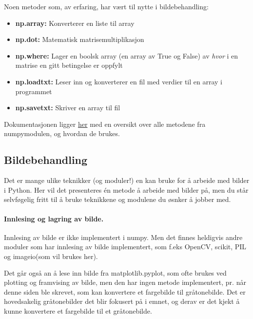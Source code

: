 \documentclass[%
oneside,                 %
final,                   %
10pt]{article}
\begin{document}
Noen metoder som, av erfaring, har vært til nytte i bildebehandling:
\begin{itemize}
\item \textbf{np.array:} Konverterer en liste til array

\item \textbf{np.dot:} Matematisk matrisemultiplikasjon

\item \textbf{np.where:} Lager en boolsk array (en array av True og False) av \emph{hvor} i en matrise en gitt betingelse er oppfylt

\item \textbf{np.loadtxt:} Leser inn og konverterer en fil med verdier til en array i programmet

\item \textbf{np.savetxt:} Skriver en array til fil
\end{itemize}

\noindent
Dokumentasjonen ligger \href{{https://docs.scipy.org/doc/numpy/reference/}}{her} med en oversikt over alle metodene fra numpymodulen, og hvordan de brukes.


\subsection{Bildebehandling}
Det er mange ulike teknikker (og moduler!) en kan bruke for å arbeide med bilder i Python. Her vil det presenteres én metode å arbeide med bilder på, men
du står selvføgelig fritt til å bruke teknikkene og modulene du øsnker å jobber med.

\paragraph{Innlesing og lagring av bilde.}
Innlesing av bilde er ikke implementert i numpy. Men det finnes heldigvis andre moduler som har innlesing av bilde implementert, som f.eks OpenCV, scikit, PIL og imageio(som vil brukes her).

Det går også an å lese inn bilde fra matplotlib.pyplot, som ofte brukes ved plotting og framvising av bilde, men den har ingen metode implementert, pr. når denne siden ble skrevet, som kan konvertere et fargebilde til gråtonebilde.
Det er hovedsakelig gråtonebilder det blir fokusert på i emnet, og derav er det kjekt å kunne konvertere et fargebilde til et gråtonebilde.



\vspace{3mm}
\end{document}

